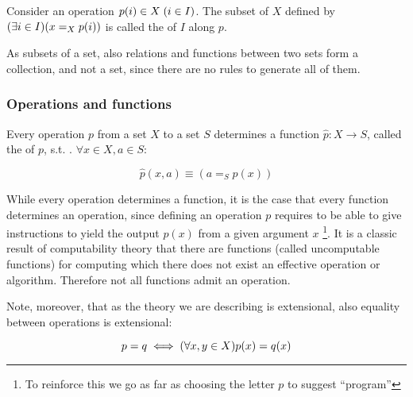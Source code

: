 Consider an operation $p(i) \in X \; (i \in I)$. The subset of $X$ defined
by $(\exists i \in I)(x =_X p(i))$ is called the  of \(I\)
along \(p\).

As subsets of a set, also relations and functions between two sets
form a collection, and not a set, since there are no rules to
generate all of them.

\subsubsection{Operations and functions}

Every operation \(p\) from a set \(X\) to a set \(S\) determines a
function \(\hat{p} : X \rightarrow S\), called the  of
\(p\), s.t. .  $\forall x \in X, a \in S$:

\[ \hat{p}(x,a) \equiv (a =_S p(x))\]

While every operation determines a function, it is  the case that
every function determines an operation, since defining an operation $p$ requires
to be able to give instructions to yield the output $p(x)$ from a given argument
$x$
\footnote{To reinforce this we go as far as choosing the letter $p$ to suggest
  ``program''}.
It is a classic result of computability theory that there are
functions (called uncomputable functions) for computing which there
does not exist an effective operation or algorithm. Therefore not all
functions admit an operation.

Note, moreover, that as the theory we are describing is extensional, also
equality between operations is extensional:

\[
  p = q \iff (\forall x,y \in X)p(x) = q(x)
\]

